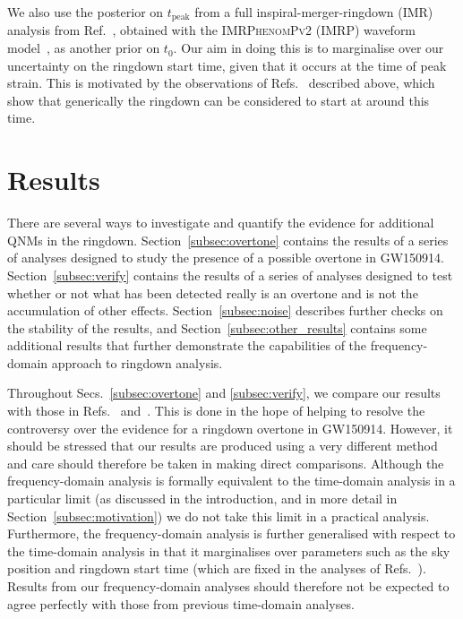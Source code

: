 We also use the posterior on $t_\mathrm{peak}$ from a full inspiral-merger-ringdown (IMR) analysis from Ref.~\cite{Isi:2022mhy}, obtained with the \textsc{IMRPhenomPv2} (IMRP) waveform model~\cite{Hannam:2013oca}, as another prior on $t_0$. 
Our aim in doing this is to marginalise over our uncertainty on the ringdown start time, given that it occurs at the time of peak strain. 
This is motivated by the observations of Refs.~\cite{Giesler:2019uxc, Bhagwat:2019dtm, Ota:2019bzl, Cook:2020otn, JimenezForteza:2020cve, Dhani:2020nik, Finch:2021iip, Forteza:2021wfq, Dhani:2021vac, MaganaZertuche:2021syq} described above, which show that generically the ringdown can be considered to start at around this time.


\section{Results}\label{sec:results}

There are several ways to investigate and quantify the evidence for additional QNMs in the ringdown.
Section~\ref{subsec:overtone} contains the results of a series of analyses designed to study the presence of a possible overtone in GW150914.
Section~\ref{subsec:verify} contains the results of a series of analyses designed to test whether or not what has been detected really is an overtone and is not the accumulation of other effects.
Section~\ref{subsec:noise} describes further checks on the stability of the results, and Section~\ref{subsec:other_results} contains some additional results that further demonstrate the capabilities of the frequency-domain approach to ringdown analysis.

Throughout Secs.~\ref{subsec:overtone} and \ref{subsec:verify}, we compare our results with those in Refs.~\cite{Cotesta:2022pci} and~\cite{Isi:2022mhy}. 
This is done in the hope of helping to resolve the controversy over the evidence for a ringdown overtone in GW150914. 
However, it should be stressed that our results are produced using a very different method and care should therefore be taken in making direct comparisons.
Although the frequency-domain analysis is formally equivalent to the time-domain analysis in a particular limit (as discussed in the introduction, and in more detail in Section~\ref{subsec:motivation}) we do not take this limit in a practical analysis. Furthermore, the frequency-domain analysis is further generalised with respect to the time-domain analysis in that it marginalises over parameters such as the sky position and ringdown start time (which are fixed in the analyses of Refs.~\cite{Cotesta:2022pci, Isi:2022mhy}).
Results from our frequency-domain analyses should therefore not be expected to agree perfectly with those from previous time-domain analyses.

